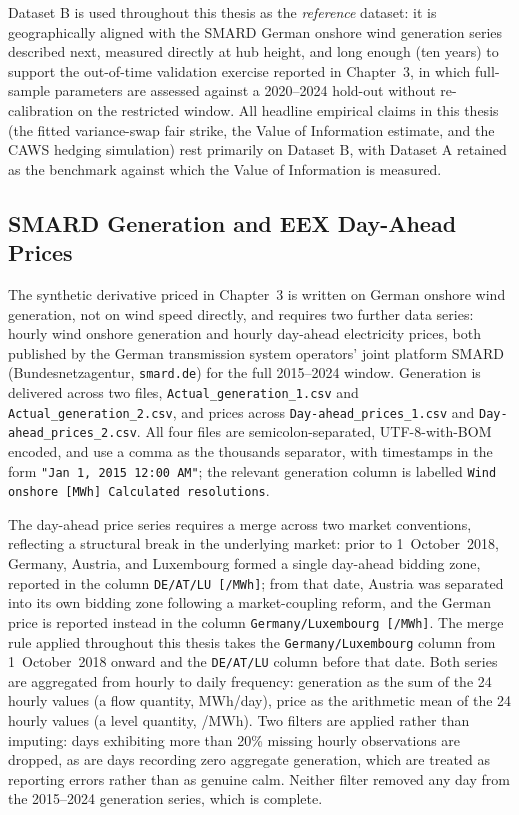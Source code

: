 \documentclass[11pt, a4paper, twoside]{article}
\begin{document}
Dataset B is used throughout this thesis as the \emph{reference} dataset: it is geographically aligned with the SMARD German onshore wind generation series described next, measured directly at hub height, and long enough (ten years) to support the out-of-time validation exercise reported in Chapter~3, in which full-sample parameters are assessed against a 2020--2024 hold-out without re-calibration on the restricted window. All headline empirical claims in this thesis (the fitted variance-swap fair strike, the Value of Information estimate, and the CAWS hedging simulation) rest primarily on Dataset B, with Dataset A retained as the benchmark against which the Value of Information is measured.

\subsection{SMARD Generation and EEX Day-Ahead Prices}
\label{sec:data-smard}

The synthetic derivative priced in Chapter~3 is written on German onshore wind generation, not on wind speed directly, and requires two further data series: hourly wind onshore generation and hourly day-ahead electricity prices, both published by the German transmission system operators' joint platform SMARD (Bundesnetzagentur, \texttt{smard.de}) for the full 2015--2024 window. Generation is delivered across two files, \texttt{Actual\_generation\_1.csv} and \texttt{Actual\_generation\_2.csv}, and prices across \texttt{Day-ahead\_prices\_1.csv} and \texttt{Day-ahead\_prices\_2.csv}. All four files are semicolon-separated, UTF-8-with-BOM encoded, and use a comma as the thousands separator, with timestamps in the form \texttt{"Jan~1,~2015~12:00~AM"}; the relevant generation column is labelled \texttt{Wind onshore [MWh] Calculated resolutions}.

The day-ahead price series requires a merge across two market conventions, reflecting a structural break in the underlying market: prior to 1~October~2018, Germany, Austria, and Luxembourg formed a single day-ahead bidding zone, reported in the column \texttt{DE/AT/LU~[\texteuro{}/MWh]}; from that date, Austria was separated into its own bidding zone following a market-coupling reform, and the German price is reported instead in the column \texttt{Germany/Luxembourg~[\texteuro{}/MWh]}. The merge rule applied throughout this thesis takes the \texttt{Germany/Luxembourg} column from 1~October~2018 onward and the \texttt{DE/AT/LU} column before that date. Both series are aggregated from hourly to daily frequency: generation as the sum of the 24 hourly values (a flow quantity, MWh/day), price as the arithmetic mean of the 24 hourly values (a level quantity, \texteuro{}/MWh). Two filters are applied rather than imputing: days exhibiting more than 20\% missing hourly observations are dropped, as are days recording zero aggregate generation, which are treated as reporting errors rather than as genuine calm. Neither filter removed any day from the 2015--2024 generation series, which is complete.
\end{document}
